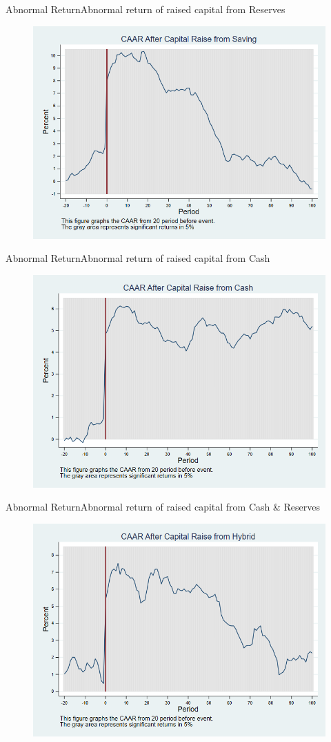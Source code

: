 \documentclass{beamer}
\begin{document}
\begin{frame}{Abnormal Return}{Abnormal return of raised capital from Reserves}
	\label{car_abnormalreturn2Saving}
	\begin{figure}
		\centering
		\includegraphics[width=0.65\linewidth]{Output/car_abnormalreturn2Saving.png}
		\label{fig:car_abnormalreturn2Saving}
	\end{figure}
\end{frame}


\begin{frame}{Abnormal Return}{Abnormal return of raised capital from Cash}
	\label{car_abnormalreturn2Cash}
	\begin{figure}
		\centering
		\includegraphics[width=0.65\linewidth]{Output/car_abnormalreturn2Cash.png}
		\label{fig:car_abnormalreturn2Cash}
	\end{figure}
	
\end{frame}

\begin{frame}{Abnormal Return}{Abnormal return of raised capital from Cash \& Reserves}
	\label{car_abnormalreturn2Hybrid}
	\begin{figure}
		\centering
		\includegraphics[width=0.65\linewidth]{Output/car_abnormalreturn2Hybrid.png}
		\label{fig:car_abnormalreturn2Hybrid}
	\end{figure}
\end{frame}
\end{document}
